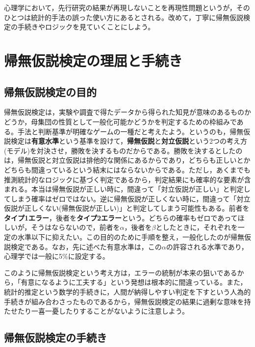 \documentclass[
  a4paper,
]{ltjsbook}
\begin{document}
心理学において，先行研究の結果が再現しないことを再現性問題というが，そのひとつは統計的手法の誤った使い方にあるとされる\autocite{Ikeda2016}。改めて，丁寧に帰無仮説検定の手続きやロジックを見ていくことにしよう。

\section{帰無仮説検定の理屈と手続き}\label{ux5e30ux7121ux4eeeux8aacux691cux5b9aux306eux7406ux5c48ux3068ux624bux7d9aux304d}

\subsection{帰無仮説検定の目的}\label{ux5e30ux7121ux4eeeux8aacux691cux5b9aux306eux76eeux7684}

帰無仮説検定は，実験や調査で得たデータから得られた知見が意味のあるものかどうか，母集団の性質として一般化可能かどうかを判定するための枠組みである。手法と判断基準が明確なゲームの一種だと考えたよう。というのも，帰無仮説検定は\textbf{有意水準}という基準を設けて，\textbf{帰無仮説}と\textbf{対立仮説}という2つの考え方(モデル)を対決させ，勝敗を決するものだからである。勝敗を決するとしたのは，帰無仮説と対立仮説は排他的な関係にあるからであり，どちらも正しいとかどちらも間違っているという結末にはならないからである。ただし，あくまでも推測統計的なロジックに基づく判定であるから，判定結果にも確率的な要素が含まれる。本当は帰無仮説が正しい時に，間違って「対立仮説が正しい」と判定してしまう確率はゼロではない。逆に帰無仮説が正しくない時に，間違って「対立仮説が正しくない(帰無仮説が正しい)」と判定してしまう可能性もある。前者を\textbf{タイプ1エラー}，後者を\textbf{タイプ2エラー}という。どちらの確率もゼロであってほしいが，そうはならないので，前者を\(\alpha\)，後者を\(\beta\)としたときに，それぞれを一定の水準以下に抑えたい。この目的のために手順を整え，一般化したのが帰無仮説検定である。なお，先に述べた有意水準は，この\(\alpha\)の許容される水準であり，心理学では一般に5\%に設定する。

このように帰無仮説検定という考え方は，エラーの統制が本来の狙いであるから，「有意になるように工夫する」という発想は根本的に間違っている。また，統計的推定という数学的手続きに，人間が納得しやすい判定を下すという人為的手続きが組み合わさったものであるから，帰無仮説検定の結果に過剰な意味を持たせたり一喜一憂したりすることがないように注意しよう。

\subsection{帰無仮説検定の手続き}\label{ux5e30ux7121ux4eeeux8aacux691cux5b9aux306eux624bux7d9aux304d}
\end{document}
